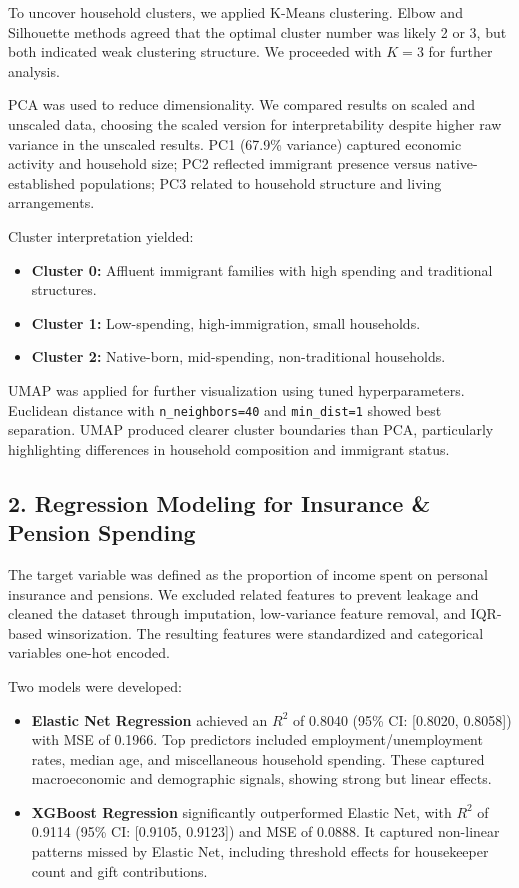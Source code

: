 \documentclass{article}
\begin{document}
To uncover household clusters, we applied K-Means clustering. Elbow and Silhouette methods agreed that the optimal cluster number was likely 2 or 3, but both indicated weak clustering structure. We proceeded with $K = 3$ for further analysis.

PCA was used to reduce dimensionality. We compared results on scaled and unscaled data, choosing the scaled version for interpretability despite higher raw variance in the unscaled results. PC1 (67.9\% variance) captured economic activity and household size; PC2 reflected immigrant presence versus native-established populations; PC3 related to household structure and living arrangements.

Cluster interpretation yielded:
\begin{itemize}
    \item \textbf{Cluster 0:} Affluent immigrant families with high spending and traditional structures.
    \item \textbf{Cluster 1:} Low-spending, high-immigration, small households.
    \item \textbf{Cluster 2:} Native-born, mid-spending, non-traditional households.
\end{itemize}

UMAP was applied for further visualization using tuned hyperparameters. Euclidean distance with \texttt{n\_neighbors=40} and \texttt{min\_dist=1} showed best separation. UMAP produced clearer cluster boundaries than PCA, particularly highlighting differences in household composition and immigrant status.

\subsection*{2. Regression Modeling for Insurance \& Pension Spending}

The target variable was defined as the proportion of income spent on personal insurance and pensions. We excluded related features to prevent leakage and cleaned the dataset through imputation, low-variance feature removal, and IQR-based winsorization. The resulting features were standardized and categorical variables one-hot encoded.

Two models were developed:
\begin{itemize}
    \item \textbf{Elastic Net Regression} achieved an $R^2$ of 0.8040 (95\% CI: [0.8020, 0.8058]) with MSE of 0.1966. Top predictors included employment/unemployment rates, median age, and miscellaneous household spending. These captured macroeconomic and demographic signals, showing strong but linear effects.
    \item \textbf{XGBoost Regression} significantly outperformed Elastic Net, with $R^2$ of 0.9114 (95\% CI: [0.9105, 0.9123]) and MSE of 0.0888. It captured non-linear patterns missed by Elastic Net, including threshold effects for housekeeper count and gift contributions.
\end{itemize}
\end{document}
